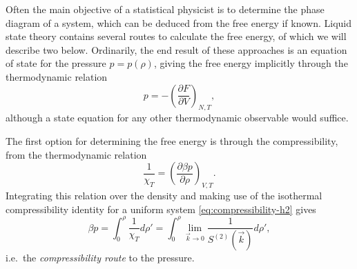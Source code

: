 Often the main objective of a statistical physicist is to determine the phase diagram of a system, which can be deduced from the free energy if known.
Liquid state theory contains several routes to calculate the free energy, of which we will describe two below.
Ordinarily, the end result of these approaches is an equation of state for the pressure $p = p(\rho)$, giving the free energy implicitly through the thermodynamic relation
\begin{equation}\label{eq:pressure-relation-1}
  p
  =
  - \left( \frac{\partial F}{\partial V} \right)_{N,T},
\end{equation}
although a state equation for any other thermodynamic observable would suffice.

The first option for determining the free energy is through the compressibility, from the thermodynamic relation
\begin{equation}
  \frac{1}{\chi_T}
  =
  \left( \frac{\partial \beta p}{\partial \rho} \right)_{V,T}.
\end{equation}
Integrating this relation over the density and making use of the isothermal compressibility identity for a uniform system \eqref{eq:compressibility-h2} gives
\begin{equation}\label{eq:compressibility-route-pressure}
  \beta p
  =
  \int_0^\rho \frac{1}{\chi_T} d\rho'
  =
  \int_0^\rho \lim_{\vec{k} \to 0} \frac{1}{S^{(2)}(\vec{k})} d\rho',
\end{equation}
i.e.\ the \emph{compressibility route} to the pressure.

